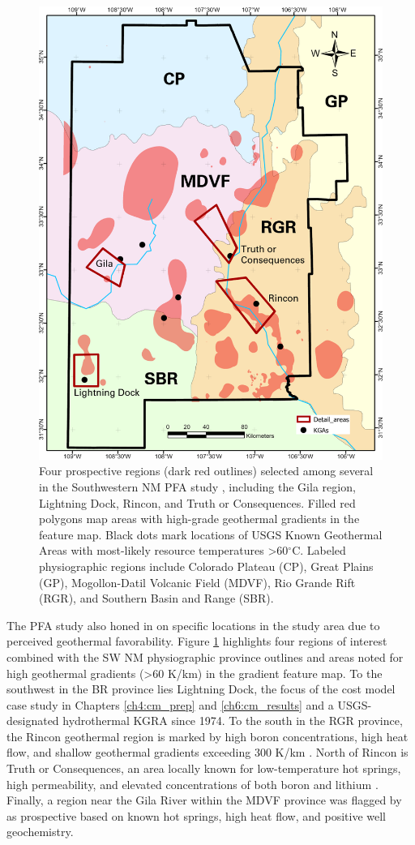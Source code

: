 \begin{figure}
\centering
\includegraphics[width=.75\textwidth]{templates/images/Figure-PFA_Gradient_Labels.png}
\caption[SW New Mexico PFA prospective areas]
{Four prospective regions (dark red outlines) selected among several in the Southwestern NM PFA study \protect\citep{bielicki_hydrogeolgic_2015}, including the Gila region, Lightning Dock, Rincon, and Truth or Consequences. Filled red polygons map areas with high-grade geothermal gradients in the \citeauthor{bielicki_hydrogeolgic_2015} feature map. Black dots mark locations of USGS Known Geothermal Areas with most-likely resource temperatures >60$^\circ$C. Labeled physiographic regions include Colorado Plateau (CP), Great Plains (GP), Mogollon-Datil Volcanic Field (MDVF), Rio Grande Rift (RGR), and Southern Basin and Range (SBR).}
\label{fig:pfa_prospects}
\end{figure}

The PFA study also honed in on specific locations in the study area due to perceived geothermal favorability. Figure \ref{fig:pfa_prospects} highlights four regions of interest combined with the SW NM physiographic province outlines and areas noted for high geothermal gradients (>60 K/km) in the \citeauthor{bielicki_hydrogeolgic_2015} gradient feature map. To the southwest in the BR province lies Lightning Dock, the focus of the cost model case study in Chapters \ref{ch4:cm_prep} and \ref{ch6:cm_results} and a USGS-designated hydrothermal KGRA since 1974. To the south in the RGR province, the Rincon geothermal region is marked by high boron concentrations, high heat flow, and shallow geothermal gradients exceeding 300 K/km \citep{witcher_deep_2002}. North of Rincon is Truth or Consequences, an area locally known for low-temperature hot springs, high permeability, and elevated concentrations of both boron and lithium \citep{pepin_deep_2015}. Finally, a region near the Gila River within the MDVF province was flagged by \citet{bielicki_hydrogeolgic_2015} as prospective based on known hot springs, high heat flow, and positive well geochemistry.

